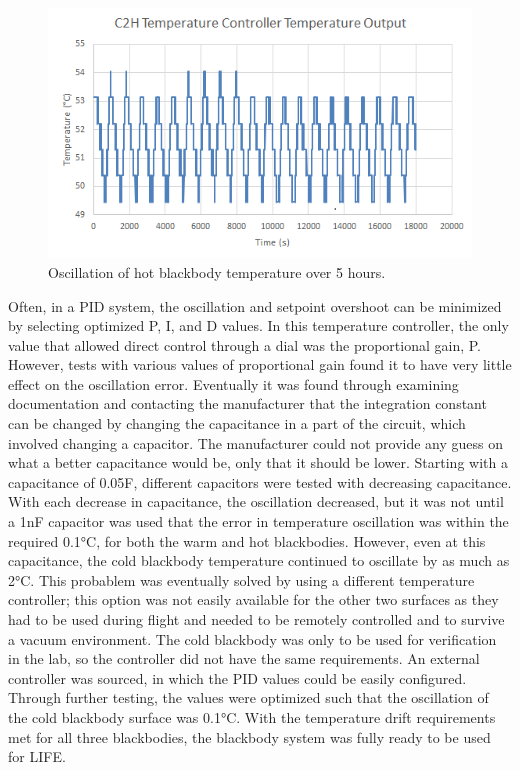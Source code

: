 \begin{figure}
    \centering
    \includegraphics{chap3_images/C2H_temperature_oscillation_excel.png}
    \caption{Oscillation of hot blackbody temperature over 5 hours.}
    \label{fig:C2H_temp_oscillation}
\end{figure}

Often, in a PID system, the oscillation and setpoint overshoot can be minimized by selecting optimized P, I, and D values. In this temperature controller, the only value that allowed direct control through a dial was the proportional gain, P. However, tests with various values of proportional gain found it to have very little effect on the oscillation error. Eventually it was found through examining documentation and contacting the manufacturer that the integration constant can be changed by changing the capacitance in a part of the circuit, which involved changing a capacitor. The manufacturer could not provide any guess on what a better capacitance would be, only that it should be lower. Starting with a capacitance of 0.05{\textmu}F, different capacitors were tested with decreasing capacitance. With each decrease in capacitance, the oscillation decreased, but it was not until a 1nF capacitor was used that the error in temperature oscillation was within the required 0.1°C, for both the warm and hot blackbodies. However, even at this capacitance, the cold blackbody temperature continued to oscillate by as much as 2°C. This probablem was eventually solved by using a different temperature controller; this option was not easily available for the other two surfaces as they had to be used during flight and needed to be remotely controlled and to survive a vacuum environment. The cold blackbody was only to be used for verification in the lab, so the controller did not have the same requirements. An external controller was sourced, in which the PID values could be easily configured. Through further testing, the values were optimized such that the oscillation of the cold blackbody surface was 0.1°C. With the temperature drift requirements met for all three blackbodies, the blackbody system was fully ready to be used for LIFE.

